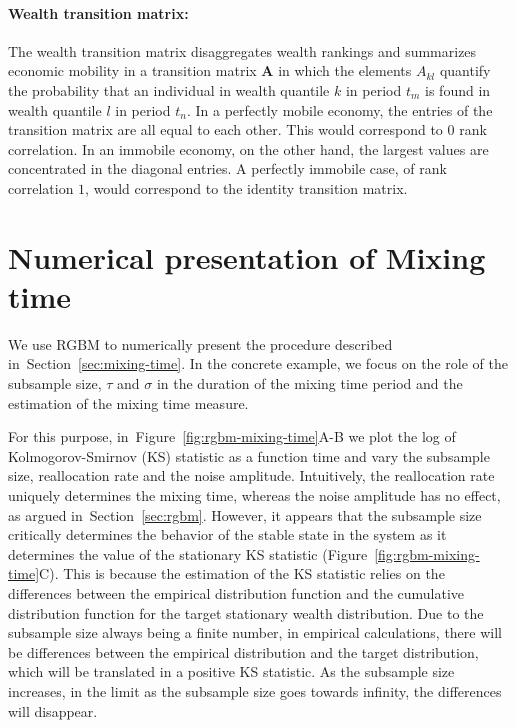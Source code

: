 \documentclass[11pt]{article}
\newcommand{\Sref}[1]{Section~\ref{sec:#1}}
\newcommand{\Fref}[1]{Figure~\ref{fig:#1}}
\numberwithin{equation}{section}
\begin{document}
\paragraph{Wealth transition matrix:} The wealth transition matrix disaggregates wealth rankings and summarizes economic mobility in a
transition matrix $\mathbf{A}$ in which the elements $A_{kl}$ quantify the probability that an individual in wealth quantile $k$ in period $t_m$ is found in wealth quantile $l$ in period $t_n$. In a perfectly mobile economy, the entries of the transition matrix are all equal to each other. This would correspond to $0$ rank correlation. In an immobile economy, on the other hand, the largest values are concentrated in the diagonal entries. A perfectly immobile case, of rank correlation $1$, would correspond to the identity transition matrix.

\section{Numerical presentation of Mixing time}\label{sec:rgbm-numerical-mixing-time}

We use RGBM to numerically present the procedure described in~\Sref{mixing-time}. In the concrete example, we focus on the role of the subsample size, $\tau$ and $\sigma$ in the duration of the mixing time period and the estimation of the mixing time measure. 

For this purpose, in~\Fref{rgbm-mixing-time}A-B we plot the log of Kolmogorov-Smirnov (KS) statistic as a function time and vary the subsample size, reallocation rate and the noise amplitude. Intuitively, the reallocation rate uniquely determines the mixing time, whereas the noise amplitude has no effect, as argued in~\Sref{rgbm}. However, it appears that the subsample size critically determines the behavior of the stable state in the system as it determines the value of the stationary KS statistic (\Fref{rgbm-mixing-time}C). This is because the estimation of the KS statistic relies on the differences between the empirical distribution function and the cumulative distribution function for the target stationary wealth distribution. Due to the subsample size always being a finite number, in empirical calculations, there will be differences between the empirical distribution and the target distribution, which will be translated in a positive KS statistic. As the subsample size increases, in the limit as the subsample size goes towards infinity, the differences will disappear.
\end{document}
